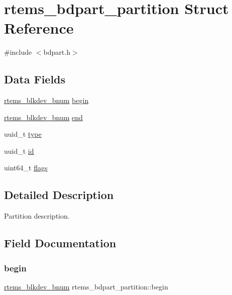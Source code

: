 \hypertarget{structrtems__bdpart__partition}{}\section{rtems\+\_\+bdpart\+\_\+partition Struct Reference}
\label{structrtems__bdpart__partition}


{\ttfamily \#include $<$bdpart.\+h$>$}

\subsection*{Data Fields}
\begin{DoxyCompactItemize}
\item 
\mbox{\hyperlink{group__rtems__disk_ga5fbcfd40b657bff6c54d9e393fab3274}{rtems\+\_\+blkdev\+\_\+bnum}} \mbox{\hyperlink{structrtems__bdpart__partition_aea3ab285afa84fc40b78f14ad31cf913}{begin}}
\item 
\mbox{\hyperlink{group__rtems__disk_ga5fbcfd40b657bff6c54d9e393fab3274}{rtems\+\_\+blkdev\+\_\+bnum}} \mbox{\hyperlink{structrtems__bdpart__partition_ad30ffdd94a2d559e14aaf93b1a116ffd}{end}}
\item 
uuid\+\_\+t \mbox{\hyperlink{structrtems__bdpart__partition_a6bba464cc39cbda2a2abcbff6839503c}{type}}
\item 
uuid\+\_\+t \mbox{\hyperlink{structrtems__bdpart__partition_ab05630a2edb3ac05876dc2c1845bed3b}{id}}
\item 
uint64\+\_\+t \mbox{\hyperlink{structrtems__bdpart__partition_a820a70ab5b27cdc40496cd1df1346b83}{flags}}
\end{DoxyCompactItemize}


\subsection{Detailed Description}
Partition description. 

\subsection{Field Documentation}
\mbox{\label{structrtems__bdpart__partition_aea3ab285afa84fc40b78f14ad31cf913}} 
\subsubsection{\texorpdfstring{begin}{begin}}
{\footnotesize\ttfamily \mbox{\hyperlink{group__rtems__disk_ga5fbcfd40b657bff6c54d9e393fab3274}{rtems\+\_\+blkdev\+\_\+bnum}} rtems\+\_\+bdpart\+\_\+partition\+::begin}

